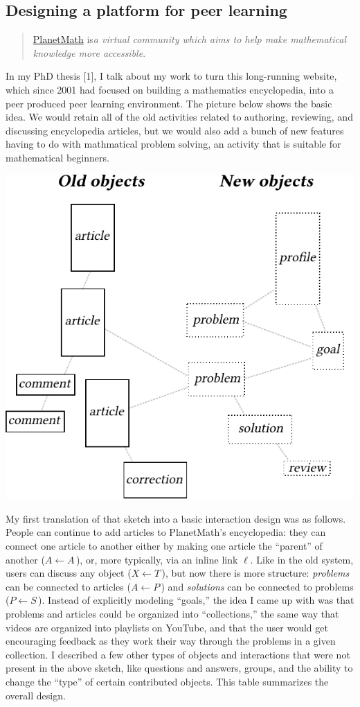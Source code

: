 \subsection{Designing a platform for peer learning\emph{}}

\begin{quote}
\href{planetmath.org}{PlanetMath} is\emph{a virtual community which aims
to help make mathematical knowledge more accessible}.
\end{quote}
In my PhD thesis {[}1{]}, I talk about my work to turn this long-running
website, which since 2001 had focused on building a mathematics
encyclopedia, into a peer produced peer learning environment. The
picture below shows the basic idea. We would retain all of the old
activities related to authoring, reviewing, and discussing encyclopedia
articles, but we would also add a bunch of new features having to do
with mathmatical problem solving, an activity that is suitable for
mathematical beginners.

\begin{center}
\includegraphics[width=.65\textwidth]{../pictures/extension-to-develop.pdf}
\end{center}

My first translation of that sketch into a basic interaction design was
as follows. People can continue to add articles to PlanetMath's
encyclopedia: they can connect one article to another either by making
one article the ``parent'' of another ($A \leftarrow A\,$), or, more typically, via an inline link $\ell$.  Like in the old system,
users can discuss any object ($X  \leftarrow T\,$),
but now there is more structure: \emph{problems} can be connected to
articles ($A \leftarrow P\,$) and \emph{solutions} can be connected to problems
($P\leftarrow S\,$). Instead of explicitly modeling ``goals,'' the idea I came up with
was that problems and articles could be organized into ``collections,''
the same way that videos are organized into playlists on YouTube, and
that the user would get encouraging feedback as they work their way
through the problems in a given collection. I described a few other
types of objects and interactions that were not present in the above
sketch, like questions and answers, groups, and the ability to change
the ``type'' of certain contributed objects. This table summarizes the
overall design.

